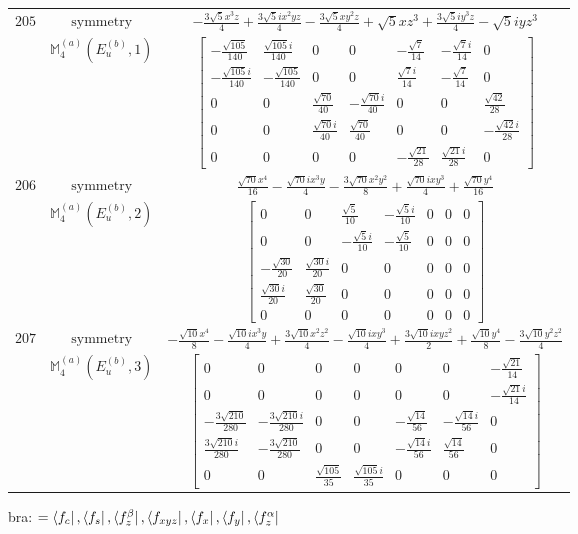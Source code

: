 \documentclass[fleqn,8pt,landscape]{jsarticle}
\begin{document}
\begin{longtable}{ccc}
$ 205 $ & $ \text{symmetry} $ & $ - \frac{3 \sqrt{5} x^{3} z}{4} + \frac{3 \sqrt{5} i x^{2} y z}{4} - \frac{3 \sqrt{5} x y^{2} z}{4} + \sqrt{5} x z^{3} + \frac{3 \sqrt{5} i y^{3} z}{4} - \sqrt{5} i y z^{3} $ \\
$  $ & $ \mathbb{M}_{4}^{(a)}(E_{u}^{(b)},1) $ & $ \begin{bmatrix} - \frac{\sqrt{105}}{140} & \frac{\sqrt{105} i}{140} & 0 & 0 & - \frac{\sqrt{7}}{14} & - \frac{\sqrt{7} i}{14} & 0 \\ - \frac{\sqrt{105} i}{140} & - \frac{\sqrt{105}}{140} & 0 & 0 & \frac{\sqrt{7} i}{14} & - \frac{\sqrt{7}}{14} & 0 \\ 0 & 0 & \frac{\sqrt{70}}{40} & - \frac{\sqrt{70} i}{40} & 0 & 0 & \frac{\sqrt{42}}{28} \\ 0 & 0 & \frac{\sqrt{70} i}{40} & \frac{\sqrt{70}}{40} & 0 & 0 & - \frac{\sqrt{42} i}{28} \\ 0 & 0 & 0 & 0 & - \frac{\sqrt{21}}{28} & \frac{\sqrt{21} i}{28} & 0 \end{bmatrix} $ \\ \hline
$ 206 $ & $ \text{symmetry} $ & $ \frac{\sqrt{70} x^{4}}{16} - \frac{\sqrt{70} i x^{3} y}{4} - \frac{3 \sqrt{70} x^{2} y^{2}}{8} + \frac{\sqrt{70} i x y^{3}}{4} + \frac{\sqrt{70} y^{4}}{16} $ \\
$  $ & $ \mathbb{M}_{4}^{(a)}(E_{u}^{(b)},2) $ & $ \begin{bmatrix} 0 & 0 & \frac{\sqrt{5}}{10} & - \frac{\sqrt{5} i}{10} & 0 & 0 & 0 \\ 0 & 0 & - \frac{\sqrt{5} i}{10} & - \frac{\sqrt{5}}{10} & 0 & 0 & 0 \\ - \frac{\sqrt{30}}{20} & \frac{\sqrt{30} i}{20} & 0 & 0 & 0 & 0 & 0 \\ \frac{\sqrt{30} i}{20} & \frac{\sqrt{30}}{20} & 0 & 0 & 0 & 0 & 0 \\ 0 & 0 & 0 & 0 & 0 & 0 & 0 \end{bmatrix} $ \\ \hline
$ 207 $ & $ \text{symmetry} $ & $ - \frac{\sqrt{10} x^{4}}{8} - \frac{\sqrt{10} i x^{3} y}{4} + \frac{3 \sqrt{10} x^{2} z^{2}}{4} - \frac{\sqrt{10} i x y^{3}}{4} + \frac{3 \sqrt{10} i x y z^{2}}{2} + \frac{\sqrt{10} y^{4}}{8} - \frac{3 \sqrt{10} y^{2} z^{2}}{4} $ \\
$  $ & $ \mathbb{M}_{4}^{(a)}(E_{u}^{(b)},3) $ & $ \begin{bmatrix} 0 & 0 & 0 & 0 & 0 & 0 & - \frac{\sqrt{21}}{14} \\ 0 & 0 & 0 & 0 & 0 & 0 & - \frac{\sqrt{21} i}{14} \\ - \frac{3 \sqrt{210}}{280} & - \frac{3 \sqrt{210} i}{280} & 0 & 0 & - \frac{\sqrt{14}}{56} & - \frac{\sqrt{14} i}{56} & 0 \\ \frac{3 \sqrt{210} i}{280} & - \frac{3 \sqrt{210}}{280} & 0 & 0 & - \frac{\sqrt{14} i}{56} & \frac{\sqrt{14}}{56} & 0 \\ 0 & 0 & \frac{\sqrt{105}}{35} & \frac{\sqrt{105} i}{35} & 0 & 0 & 0 \end{bmatrix} $ \\ \hline
\end{longtable}
bra: $=\bra{f_{c}}, \bra{f_{s}}, \bra{f_{z}^{\beta}}, \bra{f_{xyz}}, \bra{f_{x}}, \bra{f_{y}}, \bra{f_{z}^{\alpha}}$
\end{document}
